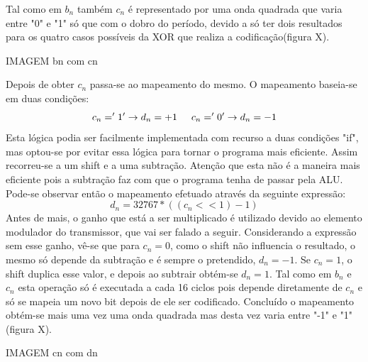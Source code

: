 \documentclass[11pt]{article}
\begin{document}
Tal como em $ b_n $ também $ c_n $ é representado por uma onda quadrada que varia entre "0" e "1" só que com o dobro do período, devido a só ter dois resultados para os quatro casos possíveis da XOR que realiza a codificação(figura X).

IMAGEM bn com cn
\vfill

Depois de obter $ c_n $ passa-se ao mapeamento do mesmo. O mapeamento baseia-se em duas condições:
\begin{equation}
	c_n= '1' \rightarrow d_n =+1 \hspace{5 mm} c_n='0' \rightarrow d_n=-1
\end{equation}
Esta lógica podia ser facilmente implementada com recurso a duas condições "if", mas optou-se por evitar essa lógica para tornar o programa mais eficiente.
Assim recorreu-se a um shift e a uma subtração. Atenção que esta não é a maneira mais eficiente pois a subtração faz com que o programa tenha de passar pela ALU.
Pode-se observar então o mapeamento efetuado através da seguinte expressão:
\begin{equation}
d_n=32767*((c_n << 1)-1)
\end{equation}
Antes de mais, o ganho que está a ser multiplicado é utilizado devido ao elemento modulador do transmissor, que vai ser falado a seguir. Considerando a expressão sem esse ganho, vê-se que para $ c_n=0 $, como o shift não influencia o resultado, o mesmo só depende da subtração e é sempre o pretendido, $d_n=-1$. Se $c_n=1$, o shift duplica  esse valor, e depois ao subtrair obtém-se $d_n=1$. \vfill
Tal como em $b_n$ e $c_n$ esta operação só é executada a cada 16 ciclos pois depende diretamente de $c_n$ e só se mapeia um novo bit depois de ele ser codificado. Concluído o mapeamento obtém-se mais uma vez uma onda quadrada mas desta vez varia entre "-1" e "1" (figura X).

IMAGEM cn com dn
\end{document}
